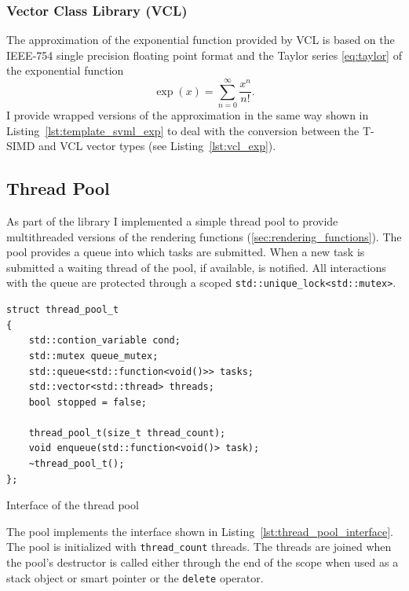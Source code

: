 \documentclass[a4paper, 11pt]{memoir}
\begin{document}
    \subsubsection{Vector Class Library (VCL)}
    \label{sec:vcl}
    The approximation of the exponential function provided by VCL is based on the IEEE-754 single precision floating
    point format and the Taylor series \eqref{eq:taylor} of the exponential function
    \begin{equation}
        \exp{(x)} = \sum_{n = 0}^\infty \frac{x^n}{n!}.
    \end{equation}
    I provide wrapped versions of the approximation in
    the same way shown in Listing~\ref{lst:template_svml_exp} to deal with the conversion between the T-SIMD and VCL
    vector types (see Listing~\ref{lst:vcl_exp}).

    \subsection{Thread Pool}
    \label{sec:thread_pool}
    As part of the library I implemented a simple thread pool to provide multithreaded versions of the rendering
    functions (\ref{sec:rendering_functions}). The pool provides a queue into which tasks are submitted. When a new task
    is submitted a waiting thread of the pool, if available, is notified. All interactions with the queue are protected
    through a scoped \texttt{std::unique_lock<std::mutex>}.

    \begin{listing}[t]
        \begin{verbatim}
struct thread_pool_t
{
    std::contion_variable cond;
    std::mutex queue_mutex;
    std::queue<std::function<void()>> tasks;
    std::vector<std::thread> threads;
    bool stopped = false;

    thread_pool_t(size_t thread_count);
    void enqueue(std::function<void()> task);
    ~thread_pool_t();
};
        \end{verbatim}
        \caption{Interface of the thread pool}
        \label{lst:thread_pool_interface}
    \end{listing}

    The pool implements the interface shown in Listing~\ref{lst:thread_pool_interface}.
    The pool is initialized with \texttt{thread_count} threads. The threads are joined when the pool's
    destructor is called either through the end of the scope when used as a stack object or smart pointer or the
    \texttt{delete} operator.
\end{document}
